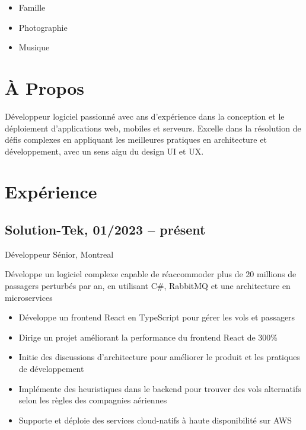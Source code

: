 \documentclass{article}
\begin{document}
\begin{paracol}{2}
\begin{leftcolumn}
    \begin{itemize}
      \item Famille
      \item Photographie
      \item Musique
    \end{itemize}


  \end{leftcolumn}
  \begin{rightcolumn}

    \vspace{-2.5em}
    \section{À Propos}

    Développeur logiciel passionné avec  ans d’expérience dans la conception et le
    déploiement d’applications web, mobiles et serveurs. Excelle dans la résolution de défis complexes en
    appliquant les meilleures pratiques en architecture et développement, avec un sens aigu du design UI et UX. 

    \section{Expérience}

    \subsection{Solution-Tek, 01/2023 -- présent}
    {Développeur Sénior, Montreal\par}
    {
      Développe un logiciel complexe capable de réaccommoder plus de 20 millions de passagers perturbés par an, en utilisant C\#, RabbitMQ et une architecture en microservices
    \par}
    \begin{itemize}
      \item Développe un frontend React en TypeScript pour gérer les vols et passagers
      \item Dirige un projet améliorant la performance du frontend React de 300\%
      \item Initie des discussions d’architecture pour améliorer le produit et les pratiques de développement
      \item Implémente des heuristiques dans le backend pour trouver des vols alternatifs selon les règles des compagnies aériennes
      \item Supporte et déploie des services cloud-natifs à haute disponibilité sur AWS
    \end{itemize}


\end{rightcolumn}
\end{paracol}
\end{document}
